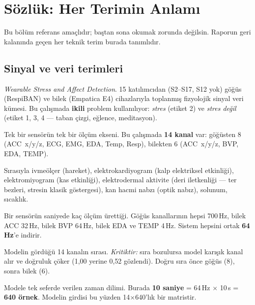 \documentclass[11pt,a4paper]{report}
\begin{document}
\chapter{Sözlük: Her Terimin Anlamı}

Bu bölüm referans amaçlıdır; baştan sona okumak zorunda değilsin. Raporun geri
kalanında geçen her teknik terim burada tanımlıdır.

\section{Sinyal ve veri terimleri}

\begin{tanim}
\begin{description}[leftmargin=0pt,style=nextline,itemsep=0.35em]

\item[WESAD] \emph{Wearable Stress and Affect Detection}. 15 katılımcıdan
(S2--S17, S12 yok) göğüs (RespiBAN) ve bilek (Empatica E4) cihazlarıyla
toplanmış fizyolojik sinyal veri kümesi. Bu çalışmada \textbf{ikili} problem
kullanılıyor: \emph{stres} (etiket 2) ve \emph{stres değil} (etiket 1, 3, 4 ---
taban çizgi, eğlence, meditasyon).

\item[Kanal] Tek bir sensörün tek bir ölçüm ekseni. Bu çalışmada
\textbf{14 kanal} var: göğüsten 8 (ACC~x/y/z, ECG, EMG, EDA, Temp, Resp),
bilekten 6 (ACC~x/y/z, BVP, EDA, TEMP).

\item[ACC / ECG / EMG / EDA / BVP / Resp / Temp] Sırasıyla ivmeölçer
(hareket), elektrokardiyogram (kalp elektriksel etkinliği), elektromiyogram
(kas etkinliği), elektrodermal aktivite (deri iletkenliği --- ter bezleri,
stresin klasik göstergesi), kan hacmi nabzı (optik nabız), solunum, sıcaklık.

\item[Örnekleme hızı (sampling rate)] Bir sensörün saniyede kaç ölçüm ürettiği.
Göğüs kanallarının hepsi 700\,Hz, bilek ACC 32\,Hz, bilek BVP 64\,Hz, bilek EDA
ve TEMP 4\,Hz. Sistem hepsini ortak \textbf{64\,Hz}'e indirir.

\item[Kanal sırası] Modelin gördüğü 14 kanalın sırası. \emph{Kritiktir:} sıra
bozulursa model karışık kanal alır ve doğruluk çöker (1{,}00 yerine 0{,}52
gözlendi). Doğru sıra önce göğüs (8), sonra bilek (6).

\item[Pencere (window)] Modele tek seferde verilen zaman dilimi. Burada
\textbf{10 saniye} = 64\,Hz $\times$ 10\,s = \textbf{640 örnek}. Modelin girdisi
bu yüzden 14$\times$640'lık bir matristir.


\end{description}
\end{tanim}
\end{document}
